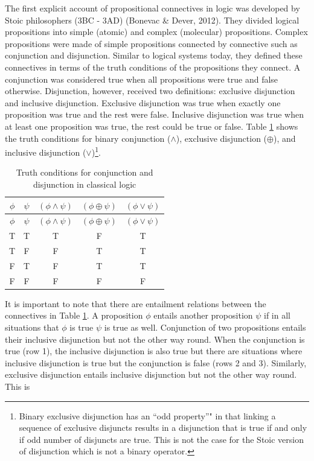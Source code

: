 \documentclass[oneside]{report}
\theoremstyle{definition}
\theoremstyle{definition}
\theoremstyle{definition}
\theoremstyle{remark}
\begin{document}
The first explicit account of propositional connectives in logic was
developed by Stoic philosophers (3BC - 3AD) (Bonevac \& Dever, 2012).
They divided logical propositions into simple (atomic) and complex
(molecular) propositions. Complex propositions were made of simple
propositions connected by connective such as conjunction and
disjunction. Similar to logical systems today, they defined these
connectives in terms of the truth conditions of the propositions they
connect. A conjunction was considered true when all propositions were
true and false otherwise. Disjunction, however, received two
definitions: exclusive disjunction and inclusive disjunction. Exclusive
disjunction was true when exactly one proposition was true and the rest
were false. Inclusive disjunction was true when at least one proposition
was true, the rest could be true or false. Table \ref{tab:truthtable}
shows the truth conditions for binary conjunction (\(\land\)), exclusive
disjunction (\(\oplus\)), and inclusive disjunction (\(\lor\))\footnote{Binary
  exclusive disjunction has an ``odd property''" in that linking a
  sequence of exclusive disjuncts results in a disjunction that is true
  if and only if odd number of disjuncts are true. This is not the case
  for the Stoic version of disjunction which is not a binary operator.}.
\begin{longtable}[]{@{}ccccc@{}}
\caption{\label{tab:truthtable} Truth conditions for conjunction and
disjunction in classical logic}\tabularnewline
\toprule
\(\phi\) & \(\psi\) & \((\phi \land \psi)\) & \((\phi \oplus \psi)\) &
\((\phi \lor \psi)\)\tabularnewline
\midrule
\endfirsthead
\toprule
\(\phi\) & \(\psi\) & \((\phi \land \psi)\) & \((\phi \oplus \psi)\) &
\((\phi \lor \psi)\)\tabularnewline
\midrule
\endhead
T & T & T & F & T\tabularnewline
T & F & F & T & T\tabularnewline
F & T & F & T & T\tabularnewline
F & F & F & F & F\tabularnewline
\bottomrule
\end{longtable}
It is important to note that there are entailment relations between the
connectives in Table \ref{tab:truthtable}. A proposition \(\phi\)
entails another proposition \(\psi\) if in all situations that \(\phi\)
is true \(\psi\) is true as well. Conjunction of two propositions
entails their inclusive disjunction but not the other way round. When
the conjunction is true (row 1), the inclusive disjunction is also true
but there are situations where inclusive disjunction is true but the
conjunction is false (rows 2 and 3). Similarly, exclusive disjunction
entails inclusive disjunction but not the other way round. This is
\end{document}
